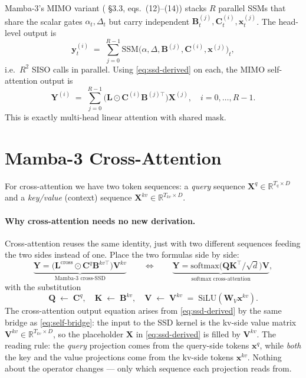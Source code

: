 \documentclass[11pt,a4paper]{article}
\begin{document}
Mamba-3's MIMO variant (\cite{mamba3} \S 3.3, eqs.~(12)–(14))
stacks $R$ parallel SSMs that share the scalar gates $\alpha_t,\Delta_t$
but carry independent $\bm{B}_t^{(j)},\bm{C}_t^{(i)},\bm{x}_t^{(j)}$.
The head-level output is
\begin{equation}
  \bm{y}_t^{(i)} \;=\; \sum_{j=0}^{R-1}\mathrm{SSM}\bigl(\alpha,\Delta,\bm{B}^{(j)},\bm{C}^{(i)},\bm{x}^{(j)}\bigr)_t,
\end{equation}
i.e.\ $R^2$ SISO calls in parallel. Using \eqref{eq:ssd-derived} on
each, the MIMO self-attention output is
\begin{equation}\label{eq:mimo-self}
  \bm{Y}^{(i)} \;=\; \sum_{j=0}^{R-1}
     \bigl(\bm{L}\odot \bm{C}^{(i)}\bm{B}^{(j)\top}\bigr)\bm{X}^{(j)},
  \quad i=0,\dots,R-1.
\end{equation}
This is exactly multi-head linear attention with shared mask.

\section{Mamba-3 Cross-Attention}
\label{sec:cross}

For cross-attention we have two token sequences: a \emph{query}
sequence $\bm{X}^{q}\in\mathbb{R}^{T_q\times D}$ and a \emph{key/value}
(context) sequence $\bm{X}^{kv}\in\mathbb{R}^{T_{kv}\times D}$.

\paragraph{Why cross-attention needs no new derivation.}
Cross-attention reuses the same identity, just with two different
sequences feeding the two sides instead of one. Place the two
formulas side by side:
\[
  \underbrace{\bm{Y} = \bigl(\bm{L}^{\text{cross}}\odot\bm{C}^q\bm{B}^{kv\top}\bigr)\bm{V}^{kv}}_{\text{Mamba-3 cross-SSD}}
  \qquad\Longleftrightarrow\qquad
  \underbrace{\bm{Y} = \mathrm{softmax}\!\bigl(\bm{Q}\bm{K}^\top/\sqrt{d}\bigr)\bm{V}}_{\text{softmax cross-attention}},
\]
with the substitution
\[
  \bm{Q} \;\leftarrow\; \bm{C}^q, \quad
  \bm{K} \;\leftarrow\; \bm{B}^{kv}, \quad
  \bm{V} \;\leftarrow\; \bm{V}^{kv} \;=\; \mathrm{SiLU}(\bm{W}_V \bm{x}^{kv}).
\]
The cross-attention output equation arises from
\eqref{eq:ssd-derived} by the same bridge as
\eqref{eq:self-bridge}: the input to the SSD kernel is the kv-side
value matrix
$\bm{V}^{kv}\in\mathbb{R}^{T_{kv}\times D}$, so the placeholder
$\bm{X}$ in \eqref{eq:ssd-derived} is filled by $\bm{V}^{kv}$.
The reading rule: the \emph{query} projection comes from the
query-side tokens $\bm{x}^{q}$, while \emph{both} the key and the
value projections come from the kv-side tokens $\bm{x}^{kv}$.
Nothing about the operator changes — only which sequence each
projection reads from.
\end{document}
